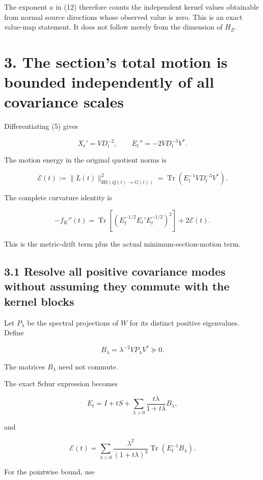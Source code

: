 The exponent \(a\) in (12) therefore counts the independent kernel values obtainable from normal source directions whose observed value is zero. This is an exact value-map statement. It does not follow merely from the dimension of \(H_Z\).

\section{3. The section's total motion is bounded independently of all covariance scales}\label{the-sections-total-motion-is-bounded-independently-of-all-covariance-scales}

Differentiating (5) gives

\[
X_t'=VD_t^{-2},
\qquad
E_t''=-2VD_t^{-3}V^*.
\]

The motion energy in the original quotient norms is

\[
\boxed{
\mathcal E(t)
:=
\|\dot L(t)\|_{\mathrm{HS}(Q(t)\to G(t))}^{2}
=
\operatorname{Tr}(E_t^{-1}VD_t^{-3}V^*).
}
\tag{17}
\]

The complete curvature identity is

\[
\boxed{
-f_K''(t)
=
\operatorname{Tr}
\left[(E_t^{-1/2}E_t'E_t^{-1/2})^2\right]
+2\mathcal E(t).
}
\tag{18}
\]

This is the metric-drift term plus the actual minimum-section-motion term.

\subsection{3.1 Resolve all positive covariance modes without assuming they commute with the kernel blocks}\label{resolve-all-positive-covariance-modes-without-assuming-they-commute-with-the-kernel-blocks}

Let \(P_\lambda\) be the spectral projections of \(W\) for its distinct positive eigenvalues. Define

\[
B_\lambda=\lambda^{-2}VP_\lambda V^*\succeq0.
\]

The matrices \(B_\lambda\) need not commute.

The exact Schur expression becomes

\[
\boxed{
E_t=I+tS+
\sum_{\lambda>0}\frac{t\lambda}{1+t\lambda}B_\lambda,
}
\tag{19}
\]

and

\[
\mathcal E(t)
=
\sum_{\lambda>0}
\frac{\lambda^2}{(1+t\lambda)^3}
\operatorname{Tr}(E_t^{-1}B_\lambda).
\tag{20}
\]

For the pointwise bound, use

